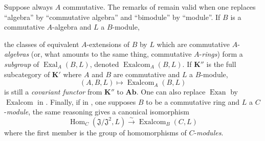 \begin{env}[18.4.2]
\label{0.18.4.2}
Suppose always $A$ commutative.
The remarks of  remain valid when one replaces ``algebra'' by ``commutative algebra'' and ``bimodule'' by ``module''.
If $B$ is a commutative $A$-algebra and $L$ a $B$-module,


the classes of equivalent $A$-extensions of $B$ by $L$ which are commutative $A$-\emph{algebras} (or, what amounts to the same thing, commutative $A$-\emph{rings}) form a \emph{subgroup} of $\operatorname{Exal}_A(B,L)$, denoted $\operatorname{Exalcom}_A(B,L)$.
If $\boldsymbol{K}''$ is the full subcategory of $\boldsymbol{K}'$ where $A$ and $B$ are commutative and $L$ a $B$-module,
\[
  (A,B,L)\mapsto\operatorname{Exalcom}_A(B,L)
\]
is still a \emph{covariant functor} from $\boldsymbol{K}''$ to $\boldsymbol{Ab}$.
One can also replace $\operatorname{Exan}$ by $\operatorname{Exalcom}$ in .
Finally, if in , one supposes $B$ to be a commutative ring and $L$ a $C$-\emph{module}, the same reasoning gives a canonical isomorphism
\begin{equation}
\tag{18.4.2.1}
  \label{0.18.4.2.1}
  \operatorname{Hom}_C(\mathfrak{J}/\mathfrak{J}^2,L)\xrightarrow{\sim}\operatorname{Exalcom}_B(C,L)
\end{equation}
where the first member is the group of homomorphisms of $C$-\emph{modules}.
\end{env}

